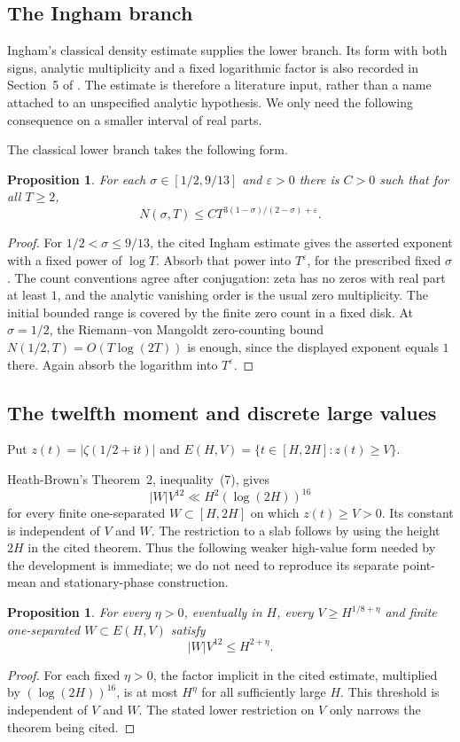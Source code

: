\documentclass[11pt,a4paper,oneside]{article}
\newtheorem{proposition}[theorem]{Proposition}
\theoremstyle{definition}
\newcommand{\eps}{\varepsilon}
\newcommand{\ii}{\mathrm i}
\numberwithin{equation}{section}
\begin{document}
\subsection{The Ingham branch}
Ingham's classical density estimate \cite{Ingham} supplies the lower branch. Its form with both signs, analytic multiplicity and a fixed logarithmic factor is also recorded in Section~5 of \cite{Ramachandra}. The estimate is therefore a literature input, rather than a name attached to an unspecified analytic hypothesis. We only need the following consequence on a smaller interval of real parts.

The classical lower branch takes the following form.
\begin{proposition}\label{prop:ingham}
For each $\sigma\in[1/2,9/13]$ and $\eps>0$ there is $C>0$ such that
for all $T\ge2$,
\[
 N(\sigma,T)\le CT^{3(1-\sigma)/(2-\sigma)+\eps}.
\]
\end{proposition}
\begin{proof}
For $1/2<\sigma\le9/13$, the cited Ingham estimate gives the asserted exponent with a fixed power of $\log T$. Absorb that power into $T^\eps$, for the prescribed fixed $\sigma$. The count conventions agree after conjugation: zeta has no zeros with real part at least $1$, and the analytic vanishing order is the usual zero multiplicity. The initial bounded range is covered by the finite zero count in a fixed disk.
At $\sigma=1/2$, the Riemann--von Mangoldt zero-counting bound $N(1/2,T)=O(T\log(2T))$ \cite[Chapter~5]{IwaniecKowalski} is enough, since the displayed exponent equals $1$ there. Again absorb the logarithm into $T^\eps$.
\end{proof}
\subsection{The twelfth moment and discrete large values}
Put $z(t)=|\zeta(1/2+\ii t)|$ and
$E(H,V)=\{t\in[H,2H]:z(t)\ge V\}$.

Heath-Brown's Theorem~2, inequality~(7), \cite{HeathBrownMoment} gives
\[
 |W|V^{12}\ll H^2(\log(2H))^{16}
\]
for every finite one-separated $W\subset[H,2H]$ on which $z(t)\ge V>0$. Its constant is independent of $V$ and $W$. The restriction to a slab follows by using the height $2H$ in the cited theorem. Thus the following weaker high-value form needed by the development is immediate; we do not need to reproduce its separate point-mean and stationary-phase construction.
\begin{proposition}\label{input:peaks}
For every $\eta>0$, eventually in $H$, every $V\ge H^{1/8+\eta}$ and finite one-separated $W\subset E(H,V)$ satisfy
\[
 |W|V^{12}\le H^{2+\eta}.
\]
\end{proposition}
\begin{proof}
For each fixed $\eta>0$, the factor implicit in the cited estimate, multiplied by $(\log(2H))^{16}$, is at most $H^\eta$ for all sufficiently large $H$. This threshold is independent of $V$ and $W$. The stated lower restriction on $V$ only narrows the theorem being cited.
\end{proof}
\end{document}
